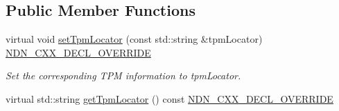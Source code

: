 \subsection*{Public Member Functions}
\begin{DoxyCompactItemize}
\item 
virtual void \hyperlink{classndn_1_1security_1_1PibMemory_a6928262565b0525e2f84da55a72f072f}{set\+Tpm\+Locator} (const std\+::string \&tpm\+Locator) \hyperlink{ndn-cxx_2src_2common_8hpp_a901daa44edd42d3f44df61d77277d57f}{N\+D\+N\+\_\+\+C\+X\+X\+\_\+\+D\+E\+C\+L\+\_\+\+O\+V\+E\+R\+R\+I\+DE}
\begin{DoxyCompactList}\small\item\em Set the corresponding T\+PM information to {\ttfamily tpm\+Locator}. \end{DoxyCompactList}\item 
virtual std\+::string \hyperlink{classndn_1_1security_1_1PibMemory_aa16e7b4fae94683eb883ef039b80bdb4}{get\+Tpm\+Locator} () const \hyperlink{ndn-cxx_2src_2common_8hpp_a901daa44edd42d3f44df61d77277d57f}{N\+D\+N\+\_\+\+C\+X\+X\+\_\+\+D\+E\+C\+L\+\_\+\+O\+V\+E\+R\+R\+I\+DE}\hypertarget{classndn_1_1security_1_1PibMemory_aa16e7b4fae94683eb883ef039b80bdb4}{}\label{classndn_1_1security_1_1PibMemory_aa16e7b4fae94683eb883ef039b80bdb4}


\end{DoxyCompactItemize}

